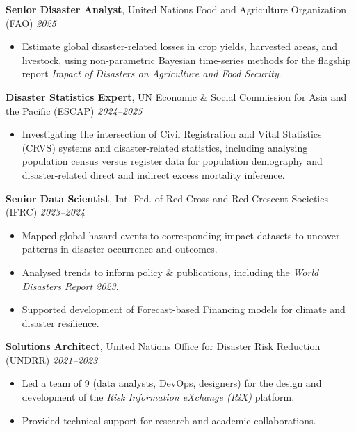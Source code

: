 \documentclass[a4paper,10pt]{article}
\begin{document}
\textbf{Senior Disaster Analyst}, United Nations Food and Agriculture Organization (FAO) \hfill \textit{2025} 
\begin{itemize}[noitemsep]
  \item Estimate global disaster-related losses in crop yields, harvested areas, and livestock, using non-parametric Bayesian time-series methods for the flagship report \textit{Impact of Disasters on Agriculture and Food Security}.
\end{itemize}


\textbf{Disaster Statistics Expert}, UN Economic \& Social Commission for Asia and the Pacific (ESCAP) \hfill \textit{2024–2025} 
\begin{itemize}[noitemsep]
  \item Investigating the intersection of Civil Registration and Vital Statistics (CRVS) systems and disaster-related statistics, including analysing population census versus register data for population demography and disaster-related direct and indirect excess mortality inference.
\end{itemize}


\textbf{Senior Data Scientist}, Int. Fed. of Red Cross and Red Crescent Societies (IFRC) \hfill \textit{2023–2024} 
\begin{itemize}[noitemsep]
  \item Mapped global hazard events to corresponding impact datasets to uncover patterns in disaster occurrence and outcomes.
  \item Analysed trends to inform policy \& publications, including the \textit{World Disasters Report 2023}.
  \item Supported development of Forecast-based Financing models for climate and disaster resilience.
\end{itemize}




\textbf{Solutions Architect}, United Nations Office for Disaster Risk Reduction (UNDRR) \hfill \textit{2021–2023} 
\begin{itemize}[noitemsep]
  \item Led a team of 9 (data analysts, DevOps, designers) for the design and development of the \textit{Risk Information eXchange (RiX)} platform.
  \item Provided technical support for research and academic collaborations.
\end{itemize}
\end{document}
